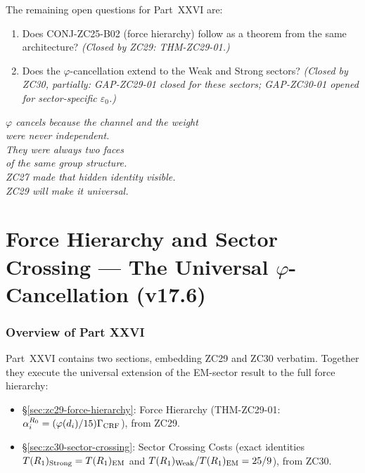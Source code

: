 \documentclass[12pt, a4paper]{article}
\begin{document}
The remaining open questions for Part~XXVI are:
\begin{enumerate}[leftmargin=*, noitemsep]
\item Does CONJ-ZC25-B02 (force hierarchy) follow as a theorem from
the same architecture? \emph{(Closed by ZC29: THM-ZC29-01.)}
\item Does the $\varphi$-cancellation extend to the Weak and Strong
sectors? \emph{(Closed by ZC30, partially: GAP-ZC29-01 closed for
these sectors; GAP-ZC30-01 opened for sector-specific $\varepsilon_0$.)}
\end{enumerate}

\begin{center}
\textit{$\varphi$ cancels because the channel and the weight\\
were never independent.\\
They were always two faces\\
of the same group structure.\\
ZC27 made that hidden identity visible.\\
ZC29 will make it universal.}
\end{center}


\part{Force Hierarchy and Sector Crossing --- The Universal $\varphi$-Cancellation (v17.6)}
\label{part:XXVI}

\section*{Overview of Part XXVI}

Part~XXVI contains two sections, embedding ZC29 and ZC30 verbatim.
Together they execute the universal extension of the EM-sector
result to the full force hierarchy:

\begin{itemize}[leftmargin=2em]
\item \S\ref{sec:zc29-force-hierarchy}: Force Hierarchy
  (THM-ZC29-01: $\alpha_i^{R_0} = (\varphi(d_i)/15)\Gamma_{\rm CRF}$),
  from ZC29.
\item \S\ref{sec:zc30-sector-crossing}: Sector Crossing Costs
  (exact identities $T(R_1)_{\rm Strong} = T(R_1)_{\rm EM}$ and
  $T(R_1)_{\rm Weak}/T(R_1)_{\rm EM} = 25/9$), from ZC30.
\end{itemize}
\end{document}
